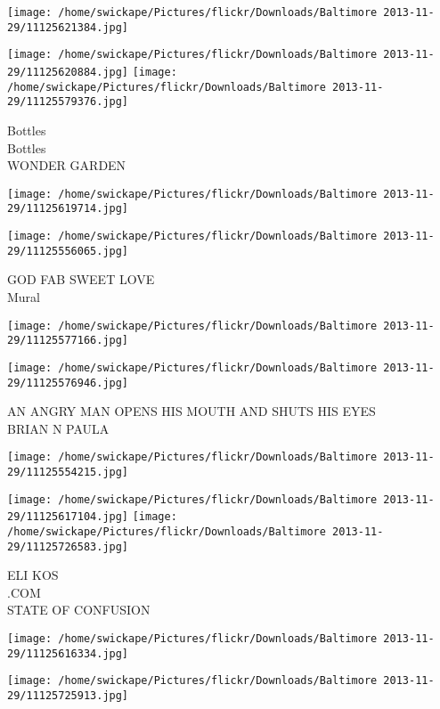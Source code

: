\documentclass[10pt,letterpaper]{article}
\begin{document}
\texttt{[image: /home/swickape/Pictures/flickr/Downloads/Baltimore 2013-11-29/11125621384.jpg]}

\vspace{0.25in}
\texttt{[image: /home/swickape/Pictures/flickr/Downloads/Baltimore 2013-11-29/11125620884.jpg]}
\texttt{[image: /home/swickape/Pictures/flickr/Downloads/Baltimore 2013-11-29/11125579376.jpg]}

Bottles\\
Bottles\\
WONDER GARDEN
\pagebreak

\texttt{[image: /home/swickape/Pictures/flickr/Downloads/Baltimore 2013-11-29/11125619714.jpg]}

\vspace{0.25in}
\texttt{[image: /home/swickape/Pictures/flickr/Downloads/Baltimore 2013-11-29/11125556065.jpg]}

GOD FAB SWEET LOVE\\
Mural
\pagebreak

\texttt{[image: /home/swickape/Pictures/flickr/Downloads/Baltimore 2013-11-29/11125577166.jpg]}

\vspace{0.25in}
\texttt{[image: /home/swickape/Pictures/flickr/Downloads/Baltimore 2013-11-29/11125576946.jpg]}

AN ANGRY MAN OPENS HIS MOUTH AND SHUTS HIS EYES\\
BRIAN N PAULA
\pagebreak

\texttt{[image: /home/swickape/Pictures/flickr/Downloads/Baltimore 2013-11-29/11125554215.jpg]}

\vspace{0.25in}
\texttt{[image: /home/swickape/Pictures/flickr/Downloads/Baltimore 2013-11-29/11125617104.jpg]}
\texttt{[image: /home/swickape/Pictures/flickr/Downloads/Baltimore 2013-11-29/11125726583.jpg]}

ELI KOS\\
.COM\\
STATE OF CONFUSION
\pagebreak

\texttt{[image: /home/swickape/Pictures/flickr/Downloads/Baltimore 2013-11-29/11125616334.jpg]}

\vspace{0.25in}
\texttt{[image: /home/swickape/Pictures/flickr/Downloads/Baltimore 2013-11-29/11125725913.jpg]}
\end{document}
